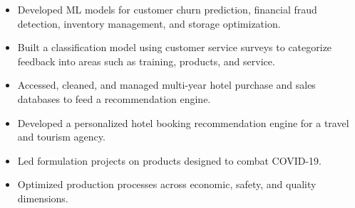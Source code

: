\documentclass[10pt,a4paper]{altacv}
\begin{document}
\begin{itemize}
    \item Developed ML models for customer churn prediction, financial fraud detection, inventory management, and storage optimization.
    \item Built a classification model using customer service surveys to categorize feedback into areas such as training, products, and service.
\end{itemize}
\begin{itemize}
    \item Accessed, cleaned, and managed multi-year hotel purchase and sales databases to feed a recommendation engine.
    \item Developed a personalized hotel booking recommendation engine for a travel and tourism agency.
\end{itemize}
\begin{itemize}
    \item Led formulation projects on products designed to combat COVID-19.
    \item Optimized production processes across economic, safety, and quality dimensions.
\end{itemize}
\end{document}
